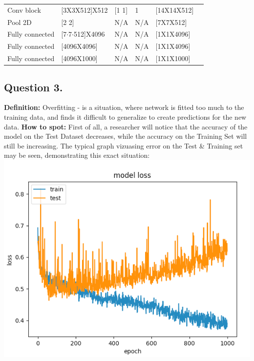 \documentclass[a4paper]{iacas}
\begin{document}
\begin{table}[]
\begin{tabular}{|l|l|l|l|l|l}
Conv block      & {[}3X3X512{]}X512      & {[}1 1{]} & 1      & {[}14X14X512{]}   &  \\ \cline{1-5}
Pool 2D         & {[}2 2{]}              & N/A       & N/A    & {[}7X7X512{]}     &  \\ \cline{1-5}
Fully connected & {[}7$\cdot$7$\cdot$512{]}X4096 & N/A       & N/A    & {[}1X1X4096{]}    &  \\ \cline{1-5}
Fully connected & {[}4096X4096{]}        & N/A       & N/A    & {[}1X1X4096{]}    &  \\ \cline{1-5}
Fully connected & {[}4096X1000{]}        & N/A       & N/A    & {[}1X1X1000{]}    &  \\ \cline{1-5}
\end{tabular}
\end{table}

\newpage
\subsection{Question 3.}
\textbf{Definition: }Overfitting - is a situation, where network is fitted too much to the training data, and finds it difficult to generalize to create predictions for the new data. 
\newline
\textbf{How to spot: }First of all, a researcher will notice that the accuracy of the model on the Test Dataset decreases, while the accuracy on the Training Set will still be increasing. The typical graph vizuasing error on the Test \& Training set may be seen, demonstrating this exact situation:
\newline
\includegraphics[scale=0.4]{imgs/overfit.PNG}
\end{document}

